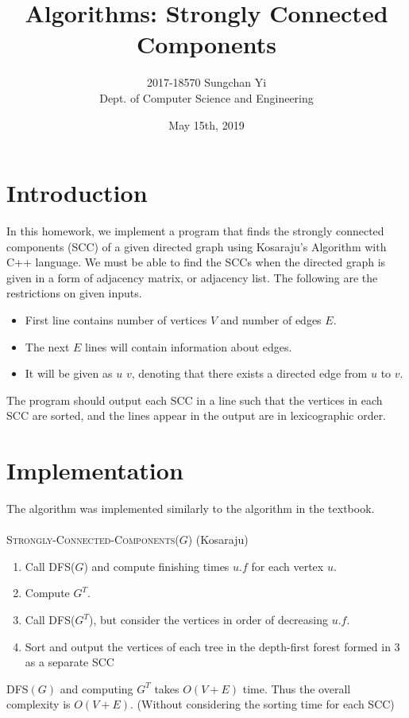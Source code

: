 \documentclass[12pt]{article}
\title{\sffamily Algorithms: Strongly Connected Components}
\author{2017-18570 Sungchan Yi\\Dept. of Computer Science and Engineering}
\date{May 15th, 2019}
\begin{document}
 

\maketitle
\tableofcontents

\section{Introduction}
In this homework, we implement a program that finds the strongly connected components (SCC) of a given directed graph using Kosaraju's Algorithm with C++ language. We must be able to find the SCCs when the directed graph is given in a form of adjacency matrix, or adjacency list.
The following are the restrictions on given inputs.
\begin{itemize}
	\item First line contains number of vertices $V$ and number of edges $E$.
	\item The next $E$ lines will contain information about edges. 
	\item It will be given as $u$ $v$, denoting that there exists a directed edge from $u$ to $v$.
\end{itemize}
The program should output each SCC in a line such that
the vertices in each SCC are sorted, and the lines appear in the output are in lexicographic order.

\section{Implementation}
The algorithm was implemented similarly to the algorithm in the textbook.\\
\\
\textsc{Strongly-Connected-Components}($G$) (Kosaraju)
\begin{enumerate}
	\item Call \textsc{DFS}($G$) and compute finishing times $u.f$ for each vertex $u$.
	\item Compute $G^T$.
	\item Call \textsc{DFS}($G^T$), but consider the vertices in order of decreasing $u.f$.
	\item Sort and output the vertices of each tree in the depth-first forest formed in 3 as a separate SCC
\end{enumerate}
\textsc{DFS}$(G)$ and computing $G^T$ takes $O(V+E)$ time. Thus the overall complexity is $O(V+E)$. (Without considering the sorting time for each SCC)
\end{document}
